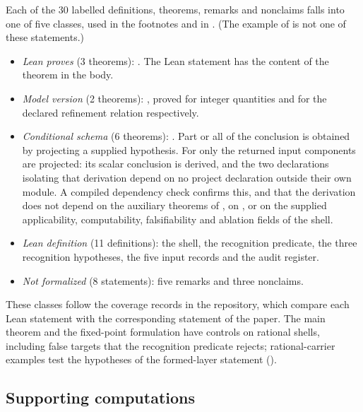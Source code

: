 Each of the $30$ labelled definitions, theorems, remarks and nonclaims
falls into one of five classes, used in the footnotes and in
.  (The example of 
is not one of these statements.)
\begin{itemize}
\item \emph{Lean proves} (3 theorems):
  .
  The Lean statement has the content of the theorem in the body.
\item \emph{Model version} (2 theorems):
  ,
  proved for integer quantities and for the declared refinement relation
  respectively.
\item \emph{Conditional schema} (6 theorems):
  .
  Part or all of the conclusion is obtained by projecting a supplied
  hypothesis.  For  only the
  returned input components are projected: its scalar conclusion is
  derived, and the two declarations isolating that derivation depend on
  no project declaration outside their own module.  A compiled dependency check
  confirms this, and that the derivation does not depend on the auxiliary
  theorems of , on
  , or on the supplied applicability,
  computability, falsifiability and ablation fields of the shell.
\item \emph{Lean definition} (11 definitions): the shell, the
  recognition predicate, the three recognition hypotheses, the five input
  records and the audit register.
\item \emph{Not formalized} (8 statements): five remarks and three
  nonclaims.
\end{itemize}
These classes follow the coverage records in the repository, which compare
each Lean statement with the corresponding statement of the paper.  The
main theorem and the fixed-point formulation have controls on rational
shells, including false targets that the recognition predicate rejects;
rational-carrier examples test the hypotheses of the formed-layer
statement ().

\subsection*{Supporting computations}

